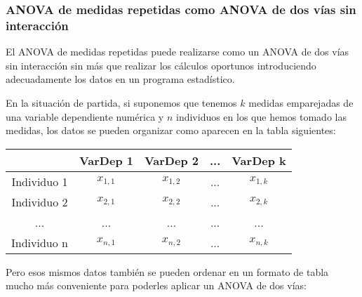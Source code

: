 \subsubsection{ANOVA de medidas repetidas como ANOVA de dos vías sin interacción}
El ANOVA de medidas repetidas puede realizarse como un ANOVA de dos vías sin interacción sin más que realizar los cálculos oportunos
introduciendo adecuadamente los datos en un programa estadístico.

En la situación de partida, si suponemos que tenemos $k$ medidas emparejadas de una variable dependiente numérica y $n$ individuos en los
que hemos tomado las medidas, los datos se pueden organizar como aparecen en la tabla siguientes:

\begin{center}
\begin{tabular}{|l|l|l|l|l|}
\cline{2-5}
\multicolumn{1}{c|}{} & \multicolumn{1}{c|}{VarDep 1} & \multicolumn{1}{c|}{VarDep 2} & \multicolumn{1}{c|}{...} & \multicolumn{1}{c|}{VarDep k} \\
\hline
\multicolumn{1}{|c|}{Individuo 1} & \multicolumn{1}{c|}{$x_{1,1}$} & \multicolumn{1}{c|}{$x_{1,2}$} & \multicolumn{1}{c|}{...} & \multicolumn{1}{c|}{$x_{1,k}$} \\
\hline
\multicolumn{1}{|c|}{Individuo 2} & \multicolumn{1}{c|}{$x_{2,1}$} & \multicolumn{1}{c|}{$x_{2,2}$} & \multicolumn{1}{c|}{...} & \multicolumn{1}{c|}{$x_{2,k}$} \\
\hline
\multicolumn{1}{|c|}{...} & \multicolumn{1}{c|}{...} & \multicolumn{1}{c|}{...} & \multicolumn{1}{c|}{...} & \multicolumn{1}{c|}{...} \\
\hline
\multicolumn{1}{|c|}{Individuo n} & \multicolumn{1}{c|}{$x_{n,1}$} & \multicolumn{1}{c|}{$x_{n,2}$} & \multicolumn{1}{c|}{...} & \multicolumn{1}{c|}{$x_{n,k}$} \\
\hline
\end{tabular}
\end{center}

Pero esos mismos datos también se pueden ordenar en un formato de tabla mucho más conveniente para poderles aplicar un ANOVA de dos vías:

